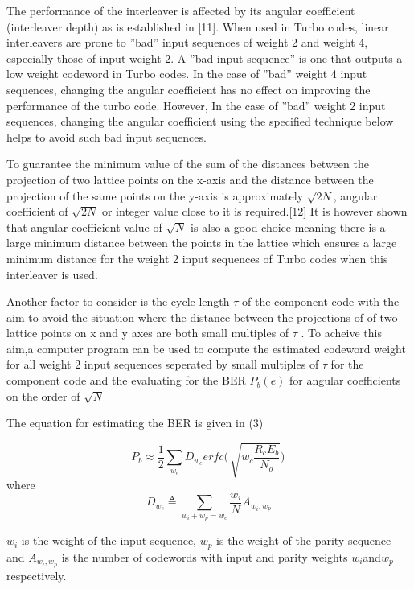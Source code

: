 \documentclass[20 pts]{article}
\begin{document}
The performance of the interleaver is affected by its angular coefficient (interleaver depth) as is established in [11]. When used in Turbo codes, linear interleavers are prone to ''bad'' input sequences of weight 2 and weight 4, especially those of input weight 2. A ''bad input sequence'' is one that outputs  a low weight codeword in Turbo codes. In the case of ''bad'' weight 4 input sequences, changing the angular coefficient has no effect on improving the performance of the turbo code. However, In the case of ''bad'' weight 2 input sequences, changing the angular coefficient using the specified technique below helps to avoid such bad input sequences.

To guarantee the minimum value of the sum of the distances between the projection of two lattice points on the x-axis and the distance between the projection of the same points on the y-axis is approximately $\sqrt{2N}$, angular coefficient of $\sqrt{2N}$  or integer value close to it is required.[12]  It is however shown that angular coefficient value of $\sqrt{N} $ is also a good choice meaning there is a large minimum distance between the points in the lattice which ensures a large minimum distance for the weight 2 input sequences of Turbo codes when this interleaver is used.

Another factor to consider is the cycle length $\tau$ of the component code with the aim to avoid the situation where the distance between the projections of of two lattice points on x and y axes are both small multiples of $\tau$ . To acheive this aim,a computer program can be used to compute the estimated codeword weight  for all weight 2 input sequences seperated by small multiples of $\tau$ for the component code and the evaluating for  the BER $P_b(e)$ for angular coefficients on the order of $\sqrt{N}$

The equation for estimating  the BER is given in (3)

\begin{equation}
P_b \approx \frac{1}{2}\sum_{w_c}D_{w_c}erfc\Big (\, \sqrt{w_c \frac{R_cE_b}{N_o}} \Big)\,
\end{equation}
where
\begin{equation*}
D_{w_c} \triangleq \sum_{w_i+w_p=w_c}\frac{w_i}{N}A_{w_i,w_p}
\end{equation*}

$w_i$ is the weight of the input sequence, $w_p$ is the weight of the parity sequence and $A_{w_i,w_p}$ is the number of codewords with input and parity weights $w_i$and$w_p$ respectively.
\end{document}
